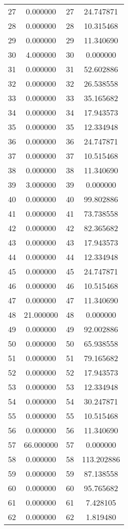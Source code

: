 \documentclass[12pt]{article}
\begin{document}
\begin{longtable}{@{}cccc@{}}
27 & 0.000000 & 27 & 24.747871 \\
28 & 0.000000 & 28 & 10.315468 \\
29 & 0.000000 & 29 & 11.340690 \\
30 & 4.000000 & 30 & 0.000000 \\
31 & 0.000000 & 31 & 52.602886 \\
32 & 0.000000 & 32 & 26.538558 \\
33 & 0.000000 & 33 & 35.165682 \\
34 & 0.000000 & 34 & 17.943573 \\
35 & 0.000000 & 35 & 12.334948 \\
36 & 0.000000 & 36 & 24.747871 \\
37 & 0.000000 & 37 & 10.515468 \\
38 & 0.000000 & 38 & 11.340690 \\
39 & 3.000000 & 39 & 0.000000 \\
40 & 0.000000 & 40 & 99.802886 \\
41 & 0.000000 & 41 & 73.738558 \\
42 & 0.000000 & 42 & 82.365682 \\
43 & 0.000000 & 43 & 17.943573 \\
44 & 0.000000 & 44 & 12.334948 \\
45 & 0.000000 & 45 & 24.747871 \\
46 & 0.000000 & 46 & 10.515468 \\
47 & 0.000000 & 47 & 11.340690 \\
48 & 21.000000 & 48 & 0.000000 \\
49 & 0.000000 & 49 & 92.002886 \\
50 & 0.000000 & 50 & 65.938558 \\
51 & 0.000000 & 51 & 79.165682 \\
52 & 0.000000 & 52 & 17.943573 \\
53 & 0.000000 & 53 & 12.334948 \\
54 & 0.000000 & 54 & 30.247871 \\
55 & 0.000000 & 55 & 10.515468 \\
56 & 0.000000 & 56 & 11.340690 \\
57 & 66.000000 & 57 & 0.000000 \\
58 & 0.000000 & 58 & 113.202886 \\
59 & 0.000000 & 59 & 87.138558 \\
60 & 0.000000 & 60 & 95.765682 \\
61 & 0.000000 & 61 & 7.428105 \\
62 & 0.000000 & 62 & 1.819480 \\

\end{longtable}
\end{document}
